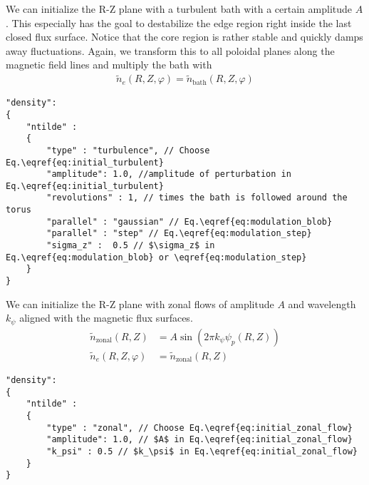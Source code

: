 We can initialize the R-Z plane with a turbulent bath with a certain amplitude $A$.
This especially has the goal to destabilize the edge region right inside the
last closed flux surface. Notice that the core region is rather stable
and quickly damps away fluctuations.
Again, we transform this to all poloidal planes along the magnetic field lines and multiply the bath with
\begin{align} \label{eq:initial_turbulent}
    \tilde n_e(R,Z,\varphi) = \tilde n_{\text{bath}}(R,Z,\varphi)
\end{align}
\begin{verbatim}
"density":
{
    "ntilde" :
    {
        "type" : "turbulence", // Choose Eq.\eqref{eq:initial_turbulent}
        "amplitude": 1.0, //amplitude of perturbation in Eq.\eqref{eq:initial_turbulent}
        "revolutions" : 1, // times the bath is followed around the torus
        "parallel" : "gaussian" // Eq.\eqref{eq:modulation_blob}
        "parallel" : "step" // Eq.\eqref{eq:modulation_step}
        "sigma_z" :  0.5 // $\sigma_z$ in Eq.\eqref{eq:modulation_blob} or \eqref{eq:modulation_step}
    }
}
\end{verbatim}
We can initialize the R-Z plane with zonal flows of amplitude $A$ and
wavelength $k_\psi$ aligned with the magnetic flux surfaces.
\begin{align} \label{eq:initial_zonal_flow}
    \tilde n_{\text{zonal}}(R,Z) &= A \sin (2\pi k_\psi \psi_p(R,Z)) \nonumber\\
\tilde n_e(R,Z,\varphi) &= \tilde n_{\text{zonal}}(R,Z)
\end{align}
\begin{verbatim}
"density":
{
    "ntilde" :
    {
        "type" : "zonal", // Choose Eq.\eqref{eq:initial_zonal_flow}
        "amplitude": 1.0, // $A$ in Eq.\eqref{eq:initial_zonal_flow}
        "k_psi" : 0.5 // $k_\psi$ in Eq.\eqref{eq:initial_zonal_flow}
    }
}
\end{verbatim}
